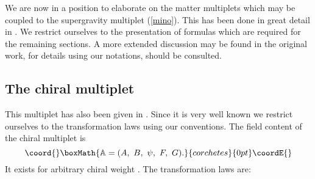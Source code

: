 \documentclass[a4paper,12pt, twoside]{article}
\numberwithin{equation}{section}
\begin{document}
We are now in a position to elaborate on the matter multiplets which 
may be coupled to the supergravity multiplet (\ref{mino}). This has been 
done in great detail in \cite{Sohnius:1983xs}. We restrict ourselves to 
the presentation of formulas which are required for the remaining 
sections. A more extended discussion may be found in the original work, for 
details using our notations, \cite{diss} should be consulted.

\subsection{The chiral multiplet}\label{chm}
This multiplet has also been given in \cite{Sohnius:1983xs}. Since it 
is very well known we restrict ourselves to the transformation laws 
using our conventions. The field content of the chiral multiplet is
\[\coord{}\boxMath{
\mathbb{A}=(A,~B,~\psi,~F,~G).
}{corchetes}{0pt}\coordE{}\]
It exists for arbitrary chiral weight \coordHE{}. The transformation laws are:
\end{document}
